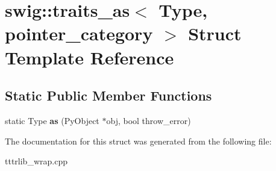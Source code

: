 \hypertarget{structswig_1_1traits__as_3_01_type_00_01pointer__category_01_4}{}\section{swig\+:\+:traits\+\_\+as$<$ Type, pointer\+\_\+category $>$ Struct Template Reference}
\label{structswig_1_1traits__as_3_01_type_00_01pointer__category_01_4}
\subsection*{Static Public Member Functions}
\begin{DoxyCompactItemize}
\item 
\mbox{\label{structswig_1_1traits__as_3_01_type_00_01pointer__category_01_4_af4d6146e7890c389c1a8c87ff57a0366}} 
static Type {\bfseries as} (Py\+Object $\ast$obj, bool throw\+\_\+error)
\end{DoxyCompactItemize}


The documentation for this struct was generated from the following file\+:\begin{DoxyCompactItemize}
\item 
tttrlib\+\_\+wrap.\+cpp\end{DoxyCompactItemize}
